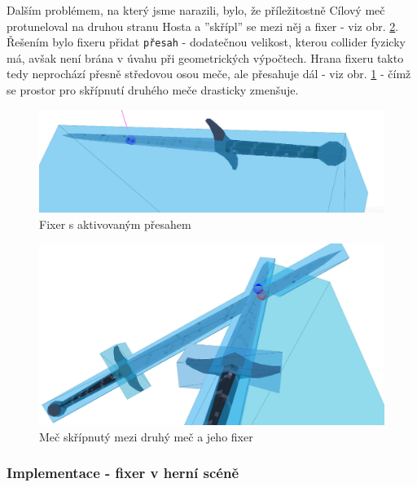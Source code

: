 \bigbreak

Dalším problémem, na který jsme narazili, bylo, že příležitostně Cílový meč protuneloval na druhou stranu Hosta a ''skřípl'' se mezi něj a fixer - viz obr. \ref{obr05:fixerSqueak}. Řešením bylo fixeru přidat \texttt{přesah} - dodatečnou velikost, kterou collider fyzicky má, avšak není brána v úvahu při geometrických výpočtech. Hrana fixeru takto tedy neprochází přesně středovou osou meče, ale přesahuje dál - viz obr. \ref{obr05:fixerOverreach} - čímž se prostor pro skřípnutí druhého meče drasticky zmenšuje. 

\begin{figure}[ht]\centering
  \center
  \includegraphics[width=140mm]{../img/fixerOverreach.png}
  \caption{Fixer s aktivovaným přesahem}
  \label{obr05:fixerOverreach}
\end{figure} 

\begin{figure}[ht]\centering
  \center
  \includegraphics[width=140mm]{../img/fixerSqueak.png}
  \caption{Meč skřípnutý mezi druhý meč a jeho fixer}
  \label{obr05:fixerSqueak}
\end{figure} 



\subsubsection*{Implementace - fixer v herní scéně}

